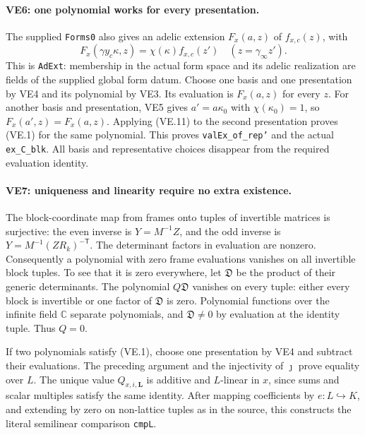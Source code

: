 \paragraph{VE6: one polynomial works for every presentation.}
The supplied \texttt{Forms0} also gives an adelic extension
$F_x(a,z)$ of $f_{x,c}(z)$, with
\[
 F_x(\gamma y_c\kappa,z)
       =\chi(\kappa)f_{x,c}(z')\quad(z=\gamma_\infty z').
                                                        \tag{VE.11}
\]
This is \texttt{AdExt}: membership in the actual form space and its
adelic realization are fields of the supplied global form datum.
Choose one basis and one presentation by VE4 and its polynomial
by VE3. Its evaluation is $F_x(a,z)$ for every $z$.
For another basis and presentation, VE5 gives $a'=a\kappa_0$ with
$\chi(\kappa_0)=1$, so $F_x(a',z)=F_x(a,z)$. Applying (VE.11)
to the second presentation proves (VE.1) for the same polynomial.
This proves \texttt{valEx\_of\_rep'} and the actual
\texttt{ex\_C\_blk}. All basis and representative choices disappear
from the required evaluation identity.

\paragraph{VE7: uniqueness and linearity require no extra existence.}
The block-coordinate map from frames onto tuples of invertible
matrices is surjective: the even inverse is $Y=M^{-1}Z$, and the
odd inverse is
$Y=M^{-1}(ZR_k)^{-\mathsf T}$.
The determinant factors in evaluation are nonzero. Consequently a
polynomial with zero frame evaluations vanishes on all invertible
block tuples. To see that it is zero everywhere, let $\mathfrak D$
be the product of their generic determinants. The polynomial
$Q\mathfrak D$ vanishes on every tuple: either every block is
invertible or one factor of $\mathfrak D$ is zero. Polynomial
functions over the infinite field $\mathbb C$ separate polynomials,
and $\mathfrak D\ne0$ by evaluation at the identity tuple.
Thus $Q=0$.

If two polynomials satisfy (VE.1), choose one presentation by VE4
and subtract their evaluations. The preceding argument and the
injectivity of $\jmath$ prove equality over $L$. The unique value
$Q_{x,i,\mathbf L}$ is additive and $L$-linear in $x$, since sums
and scalar multiples satisfy the same identity. After mapping
coefficients by $e:L\hookrightarrow K$, and extending by zero on
non-lattice tuples as in the source, this constructs the literal
semilinear comparison \texttt{cmpL}.


